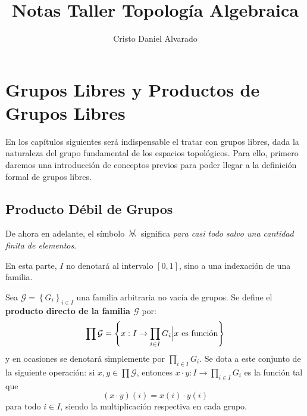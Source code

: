 \documentclass[12pt]{report}
\newcounter{it}
\theoremstyle{largebreak}
\newcommand\cf[3]{\ensuremath{#1:#2\rightarrow#3}}
\newcommand{\afa}{\:
    \begin{tikzpicture}
        \draw [line width = 0.17 mm, black] (0,0) -- (-0.115,0.29);
        \draw [line width = 0.17 mm, black] (0,0) -- (0.115,0.29);
        \draw [line width = 0.17 mm, black] (-0.12,0) arc (190:-10:0.12cm);
    \end{tikzpicture}
    \:
}
\begin{document}
    \setlength{\parskip}{5pt} %
    \setlength{\parindent}{12pt} %
    \title{Notas Taller Topología Algebraica}
    \author{Cristo Daniel Alvarado}
    \maketitle

    \tableofcontents %

    \setcounter{chapter}{1} %
    
    \chapter{Grupos Libres y Productos de Grupos Libres}
    
    En los capítulos siguientes será indispensable el tratar con grupos libres, dada la naturaleza del grupo fundamental de los espacios topológicos. Para ello, primero daremos una introducción de conceptos previos para poder llegar a la definición formal de grupos libres.\\
    
    \section{Producto Débil de Grupos}
    
    \begin{obs}
        De ahora en adelante, el símbolo $\afa$ significa \textit{para casi todo salvo una cantidad finita de elementos}.
    \end{obs}

    \begin{obs}
        En esta parte, $I$ no denotará al intervalo $[0,1]$, sino a una indexación de una familia.
    \end{obs}

    \begin{mydef}
        Sea $\mathcal{G}=\left\{G_i \right\}_{ i\in I}$ una familia arbitraria no vacía de grupos. Se define el \textbf{producto directo de la familia $\mathcal{G}$} por:
        \begin{equation*}
            \prod\mathcal{G}=\left\{\cf{x}{I}{\prod_{ i\in I}G_i}\Big|x\textup{ es función} \right\}
        \end{equation*}
        y en ocasiones se denotará simplemente por $\prod_{ i\in I}G_i$. Se dota a este conjunto de la siguiente operación: si $x,y\in\prod\mathcal{G}$, entonces $\cf{x\cdot y}{I}{\prod_{ i\in I}G_i}$ es la función tal que
        \begin{equation*}
            (x\cdot y)(i)=x(i)\cdot y(i)
        \end{equation*}
        para todo $i\in I$, siendo la multiplicación respectiva en cada grupo.
    \end{mydef}
\end{document}
